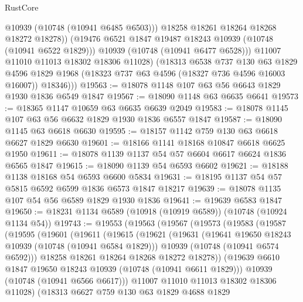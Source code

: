 \begin{lexlean}{RustCore}
\begin{coremodule}
                  @10939
                  (@10748 (@10941 @6485 @6503)))
                @18258
                @18261
                @18264
                @18268
                @18272
                @18278))
            (@19476 @6521 @1847 @19487 @18243 @10939 (@10748 (@10941 @6522 @1829)))
            @10939
            (@10748 (@10941 @6477 @6528)))
          @11007
          @11010
          @11013
          @18302
          @18306
          @11028)
        (@18313
          @6538
          @737
          @130
          @63
          @1829
          @4596
          @1829
          @1968
          (@18323 @737 @63 @4596 (@18327 @736 @4596 @16003 @16007))
          @18346)))
@19563 := @18078 @1148 @107 @63 @56 @6643 @1829 @1930 @1836 @6549 @1847
@19567 := @18090 @1148 @63 @6635 @6641
@19573 := @18365 @1147 @10659 @63 @6635 @6639 @2049
@19583 := @18078 @1145 @107 @63 @56 @6632 @1829 @1930 @1836 @6557 @1847
@19587 := @18090 @1145 @63 @6618 @6630
@19595 := @18157 @1142 @759 @130 @63 @6618 @6627 @1829 @6630
@19601 := @18166 @1141 @18168 @10847 @6618 @6625 @1950
@19611 := @18078 @1139 @1137 @54 @57 @6604 @6617 @6624 @1836 @6565 @1847
@19615 := @18090 @1139 @54 @6593 @6602
@19621 := @18188 @1138 @18168 @54 @6593 @6600 @5834
@19631 := @18195 @1137 @54 @57 @5815 @6592 @6599 @1836 @6573 @1847 @18217
@19639 := @18078 @1135 @107 @54 @56 @6589 @1829 @1930 @1836
@19641 := @19639 @6583 @1847
@19650 := @18231 @1134 @6589 (@10918 (@10919 @6589)) (@10748 (@10924 @1134 @54))
@19743 := @19553
    (@19563
      (@19567
        (@19573
          (@19583
            (@19587
              (@19595
                (@19601
                  (@19611
                    (@19615
                      (@19621
                        (@19631
                          (@19641 @19650 @18243 @10939 (@10748 (@10941 @6584 @1829)))
                          @10939
                          (@10748 (@10941 @6574 @6592)))
                        @18258
                        @18261
                        @18264
                        @18268
                        @18272
                        @18278))
                    (@19639 @6610 @1847 @19650 @18243 @10939 (@10748 (@10941 @6611 @1829)))
                    @10939
                    (@10748 (@10941 @6566 @6617)))
                  @11007
                  @11010
                  @11013
                  @18302
                  @18306
                  @11028)
                (@18313
                  @6627
                  @759
                  @130
                  @63
                  @1829
                  @4688
                  @1829

\end{coremodule}
\end{lexlean}
